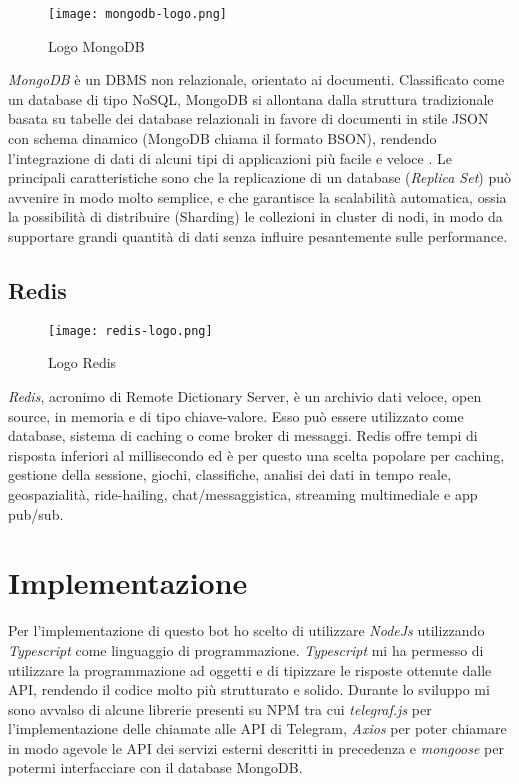 \begin{wrapfigure}{r}{0.33\textwidth}
\centering
\texttt{[image: mongodb-logo.png]}
\caption{Logo MongoDB}
\end{wrapfigure}

\textit{MongoDB} è un DBMS non relazionale, orientato ai documenti. Classificato come un database di tipo NoSQL, MongoDB si allontana dalla struttura tradizionale basata su tabelle dei database relazionali in favore di documenti in stile JSON con schema dinamico (MongoDB chiama il formato BSON), rendendo l'integrazione di dati di alcuni tipi di applicazioni più facile e veloce \cite{Mongodb}. Le principali caratteristiche sono che la replicazione di un database (\textit{Replica Set}) può avvenire in modo molto semplice, e che garantisce la scalabilità automatica, ossia la possibilità di distribuire (Sharding) le collezioni in cluster di nodi, in modo da supportare grandi quantità di dati senza influire pesantemente sulle performance.

\subsection{Redis}

\begin{wrapfigure}{r}{0.33\textwidth}
\centering
\texttt{[image: redis-logo.png]}
\caption{Logo Redis}
\end{wrapfigure}

\textit{Redis}, acronimo di Remote Dictionary Server, è un archivio dati veloce, open source, in memoria e di tipo chiave-valore. Esso può essere utilizzato come database, sistema di caching o come broker di messaggi. Redis offre tempi di risposta inferiori al millisecondo ed è per questo una scelta popolare per caching, gestione della sessione, giochi, classifiche, analisi dei dati in tempo reale, geospazialità, ride-hailing, chat/messaggistica, streaming multimediale e app pub/sub. \cite{Redis}

\pagebreak

\section{Implementazione}
\label{sec:implementazione}

Per l'implementazione di questo bot ho scelto di utilizzare \textit{NodeJs} utilizzando \textit{Typescript} come linguaggio di programmazione. \textit{Typescript} mi ha permesso di utilizzare la programmazione ad oggetti e di tipizzare le risposte ottenute dalle API, rendendo il codice molto più strutturato e solido.  Durante lo sviluppo mi sono avvalso di alcune librerie presenti su NPM tra cui \textit{telegraf.js} per l'implementazione delle chiamate alle API di Telegram, \textit{Axios} per poter chiamare in modo agevole le API dei servizi esterni descritti in precedenza e \textit{mongoose} per potermi interfacciare con il database MongoDB.

